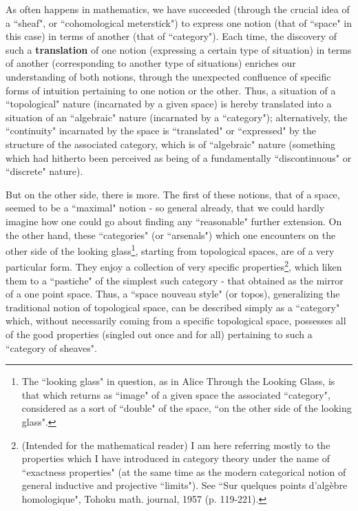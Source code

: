 As often happens in mathematics, we have succeeded (through the crucial idea of a ``sheaf", or ``cohomological meterstick") to express one notion (that of ``space" in this case) in terms of another (that of ``category"). Each time, the discovery of such a \textbf{translation} of one notion (expressing a certain type of situation) in terms of another (corresponding to another type of situations) enriches our understanding of both notions, through the unexpected confluence of specific forms of intuition pertaining to one notion or the other. Thus, a situation of a ``topological" nature (incarnated by a given space) is hereby translated into a situation of an ``algebraic" nature (incarnated by a ``category"); alternatively, the ``continuity" incarnated by the space is ``translated" or ``expressed" by the structure of the associated category, which is of ``algebraic" nature (something which had hitherto been perceived as being of a fundamentally ``discontinuous" or ``discrete" nature).

But on the other side, there is more. The first of these notions, that of a space, seemed to be a ``maximal" notion - so general already, that we could hardly imagine how one could go about finding any ``reasonable" further extension. On the other hand, these ``categories" (or ``arsenals") which one encounters on the other side of the looking glass\footnote{The ``looking glass" in question, as in Alice Through the Looking Glass, is that which returns as ``image" of a given space the associated ``category", considered as a sort of ``double" of the space, ``on the other side of the looking glass".}, starting from topological spaces, are of a very particular form. They enjoy a collection of very specific properties\footnote{(Intended for the mathematical reader) I am here referring mostly to the properties which I have introduced in category theory under the name of ``exactness properties" (at the same time as the modern categorical notion of general inductive and projective ``limits"). See ``Sur quelques points d'alg\`ebre homologique", Tohoku math. journal, 1957 (p. 119-221).}, which liken them to a ``pastiche" of the simplest such category - that obtained as the mirror of a one point space. Thus, a ``space nouveau style" (or topos), generalizing the traditional notion of topological space, can be described simply as a ``category" which, without necessarily coming from a specific topological space, possesses all of the good properties (singled out once and for all) pertaining to such a ``category of sheaves". 
\begin{center} {\fontsize{14}{14}\selectfont {}} \end{center}


